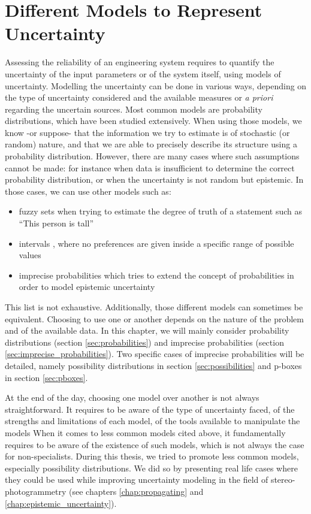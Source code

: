 \section{Different Models to Represent Uncertainty}\label{sec:different_models_of_uncertainty}
Assessing the reliability of an engineering system requires to quantify the uncertainty of the input parameters or of the system itself, using models of uncertainty. Modelling the uncertainty can be done in various ways, depending on the type of uncertainty considered and the available measures or \textit{a priori} regarding the uncertain sources. Most common models are probability distributions, which have been studied extensively. When using those models, we know -or suppose- that the information we try to estimate is of stochastic (or random) nature, and that we are able to precisely describe its structure using a probability distribution. However, there are many cases where such assumptions cannot be made: for instance when data is insufficient to determine the correct probability distribution, or when the uncertainty is not random but epistemic. In those cases, we can use other models such as:
\begin{itemize}
    \item fuzzy sets \cite{zadeh_fuzzy_1999} when trying to estimate the degree of truth of a statement such as ``This person is tall''
    \item intervals \cite{jaulin_applied_2001}, where no preferences are given inside a specific range of possible values
    \item imprecise probabilities which tries to extend the concept of probabilities in order to model epistemic uncertainty
\end{itemize}
This list is not exhaustive. Additionally, those different models can sometimes be equivalent. Choosing to use one or another depends on the nature of the problem and of the available data. In this chapter, we will mainly consider probability distributions (section \ref{sec:probabilities}) and imprecise probabilities (section \ref{sec:imprecise_probabilities}). Two specific cases of imprecise probabilities will be detailed, namely possibility distributions in section \ref{sec:possibilities} and p-boxes in section \ref{sec:pboxes}.

At the end of the day, choosing one model over another is not always straightforward. It requires to be aware of the type of uncertainty faced, of the strengths and limitations of each model, of the tools available to manipulate the models \etc When it comes to less common models cited above, it fundamentally requires to be aware of the existence of such models, which is not always the case for non-specialists. During this thesis, we tried to promote less common models, especially possibility distributions. We did so by presenting real life cases where they could be used while improving uncertainty modeling in the field of stereo-photogrammetry (see chapters \ref{chap:propagating} and \ref{chap:epistemic_uncertainty}). 

